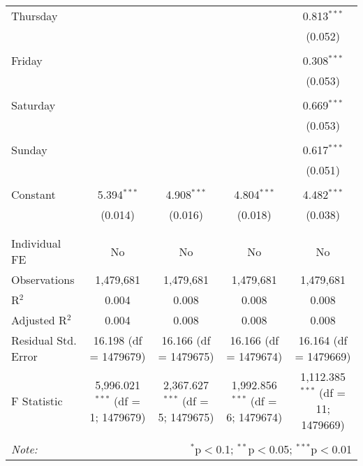 \documentclass[
]{article}
\begin{document}
\begin{table}[!htbp]
{\begin{tabular}{@{\extracolsep{5pt}}lcccc}
 Thursday &  &  &  & 0.813$^{***}$ \\ 
  &  &  &  & (0.052) \\ 
  & & & & \\ 
 Friday &  &  &  & 0.308$^{***}$ \\ 
  &  &  &  & (0.053) \\ 
  & & & & \\ 
 Saturday &  &  &  & 0.669$^{***}$ \\ 
  &  &  &  & (0.053) \\ 
  & & & & \\ 
 Sunday &  &  &  & 0.617$^{***}$ \\ 
  &  &  &  & (0.051) \\ 
  & & & & \\ 
 Constant & 5.394$^{***}$ & 4.908$^{***}$ & 4.804$^{***}$ & 4.482$^{***}$ \\ 
  & (0.014) & (0.016) & (0.018) & (0.038) \\ 
  & & & & \\ 
\hline \\[-1.8ex] 
Individual FE & No & No & No & No \\ 
Observations & 1,479,681 & 1,479,681 & 1,479,681 & 1,479,681 \\ 
R$^{2}$ & 0.004 & 0.008 & 0.008 & 0.008 \\ 
Adjusted R$^{2}$ & 0.004 & 0.008 & 0.008 & 0.008 \\ 
Residual Std. Error & 16.198 (df = 1479679) & 16.166 (df = 1479675) & 16.166 (df = 1479674) & 16.164 (df = 1479669) \\ 
F Statistic & 5,996.021$^{***}$ (df = 1; 1479679) & 2,367.627$^{***}$ (df = 5; 1479675) & 1,992.856$^{***}$ (df = 6; 1479674) & 1,112.385$^{***}$ (df = 11; 1479669) \\ 
\hline 
\hline \\[-1.8ex] 
\textit{Note:}  & \multicolumn{4}{r}{$^{*}$p$<$0.1; $^{**}$p$<$0.05; $^{***}$p$<$0.01} \\ 
\end{tabular}
} 
\end{table} 
\newpage
\end{document}

